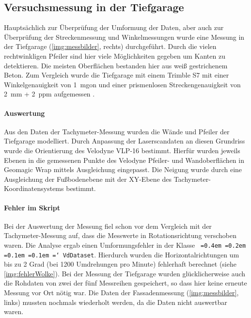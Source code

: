 \documentclass[a4paper,12pt,bibliography=totoc, listof=totoc,titlepage,pointlessnumbers]{scrreprt}
\newcommand*\justify{%
  \fontdimen2\font=0.4em%
  \fontdimen3\font=0.2em%
  \fontdimen4\font=0.1em%
  \fontdimen7\font=0.1em%
  \hyphenchar\font=`\-%
}
\newcommand{\code}[1]{\texttt{\justify{#1}}}
\begin{document}
\subsection{Versuchsmessung in der Tiefgarage}
Hauptsächlich zur Überprüfung der Umformung der Daten, aber auch zur Überprüfung der Streckenmessung und Winkelmessungen wurde eine Messung in der Tiefgarage (\autoref{img:messbilder}, rechts) durchgeführt. Durch die vielen rechtwinkligen Pfeiler sind hier viele Mög\-lich\-keiten gegeben um Kanten zu detektieren. Die meisten Oberflächen bestanden hier aus weiß gestrichenem Beton. Zum Vergleich wurde die Tiefgarage mit einem Trimble S7 mit einer Winkelgenauigkeit von 1~mgon und einer prismenlosen Streckengenauigkeit von 2~mm + 2~ppm aufgemessen \citep{trimbles7}.

\paragraph{Auswertung}
Aus den Daten der Tachymeter-Messung wurden die Wände und Pfeiler der Tiefgarage modelliert. Durch Anpassung der Laserscandaten an diesen Grundriss wurde die Orientierung des Velodyne VLP-16 bestimmt. Hierfür wurden jeweils Ebenen in die gemessenen Punkte des Velodyne Pfeiler- und Wandoberflächen in Geomagic Wrap mittels Ausgleichung eingepasst. Die Neigung wurde durch eine Ausgleichung der Fußbodenebene mit der XY-Ebene des Tachymeter-Koordinatensystems bestimmt. 

\paragraph{Fehler im Skript} Bei der Auswertung der Messung fiel schon vor dem Vergleich mit der Tachymeter-Messung auf, dass die Messwerte in Rotationsrichtung verschoben waren. Die Analyse ergab einen Umformungsfehler in der Klasse \code{VdDataset}. Hierdurch wurden die Horizontalrichtungen um bis zu 2 Grad (bei 1200 Umdrehungen pro Minute) fehlerhaft berechnet (siehe \autoref{img:fehlerWolke}). Bei der Messung der Tiefgarage wurden glücklicherweise auch die Rohdaten von zwei der fünf Messreihen gespeichert, so dass hier keine erneute Messung vor Ort nötig war. Die Daten der Fassadenmessung (\autoref{img:messbilder}, links) mussten nochmals wiederholt werden, da die Daten nicht auswertbar waren.
\end{document}
